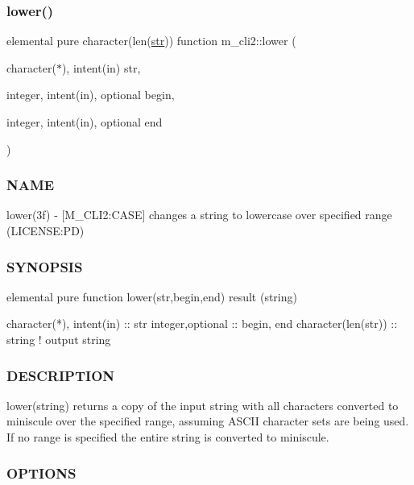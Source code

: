 \subsubsection{\texorpdfstring{lower()}{lower()}}
{\footnotesize\ttfamily elemental pure character(len(\mbox{\hyperlink{interfacem__cli2_1_1str}{str}})) function m\+\_\+cli2\+::lower (\begin{DoxyParamCaption}\item[{character($\ast$), intent(in)}]{str,  }\item[{integer, intent(in), optional}]{begin,  }\item[{integer, intent(in), optional}]{end }\end{DoxyParamCaption})\hspace{0.3cm}{\ttfamily [private]}}



\subsubsection*{N\+A\+ME}

lower(3f) -\/ \mbox{[}M\+\_\+\+C\+L\+I2\+:C\+A\+SE\mbox{]} changes a string to lowercase over specified range (L\+I\+C\+E\+N\+SE\+:PD) 

\subsubsection*{S\+Y\+N\+O\+P\+S\+IS}

\begin{DoxyVerb}elemental pure function lower(str,begin,end) result (string)

 character(*), intent(in) :: str
 integer,optional         :: begin, end
 character(len(str))      :: string  ! output string
\end{DoxyVerb}
 \subsubsection*{D\+E\+S\+C\+R\+I\+P\+T\+I\+ON}

lower(string) returns a copy of the input string with all characters converted to miniscule over the specified range, assuming A\+S\+C\+II character sets are being used. If no range is specified the entire string is converted to miniscule.

\subsubsection*{O\+P\+T\+I\+O\+NS}

